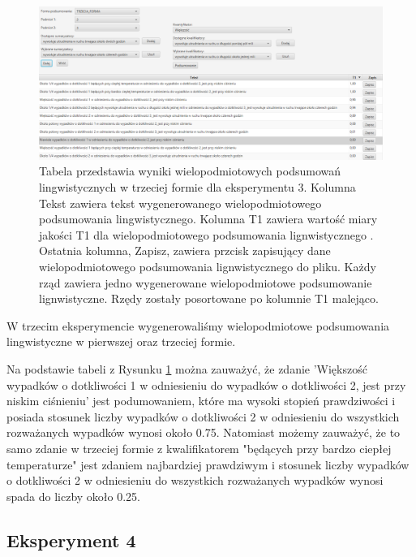 \documentclass{classrep}
\begin{document}
\begin{figure}[h!]
 \centering
 \includegraphics[width=15cm]{ex_wiel3.png}
 \vspace{-0.3cm}
 \caption{Tabela przedstawia wyniki wielopodmiotowych podsumowań lingwistycznych w trzeciej formie dla eksperymentu 3. Kolumna Tekst zawiera tekst wygenerowanego wielopodmiotowego podsumowania lingwistycznego. Kolumna T1 zawiera wartość miary jakości T1 dla wielopodmiotowego podsumowania lignwistycznego \cite{niewiadomski19}. Ostatnia kolumna, Zapisz, zawiera przcisk zapisujący dane wielopodmiotowego podsumowania lignwistycznego do pliku. Każdy rząd zawiera jedno wygenerowane wielopodmiotowe podsumowanie lignwistyczne. Rzędy zostały posortowane po kolumnie T1 malejąco.  }
 \label{wykr_ex_wiel3}
\end{figure}

W trzecim eksperymencie wygenerowaliśmy wielopodmiotowe podsumowania lingwistyczne w pierwszej oraz trzeciej formie. 

Na podstawie tabeli z Rysunku \ref{wykr_ex_wiel3} można zauważyć, że zdanie 'Większość wypadków o dotkliwości 1 w odniesieniu do wypadków o dotkliwości 2, jest przy niskim ciśnieniu' jest podumowaniem, które ma wysoki stopień prawdziwości i posiada stosunek liczby wypadków o dotkliwości 2 w odniesieniu do wszystkich rozważanych wypadków wynosi około 0.75. Natomiast możemy zauważyć, że to samo zdanie w trzeciej formie z kwalifikatorem "będących przy bardzo ciepłej temperaturze" jest zdaniem najbardziej prawdziwym i stosunek liczby wypadków o dotkliwości 2 w odniesieniu do wszystkich rozważanych wypadków wynosi spada do liczby około 0.25. 

\newpage
\subsection{Eksperyment 4}
\label{section:ex_wiel4}
\end{document}
